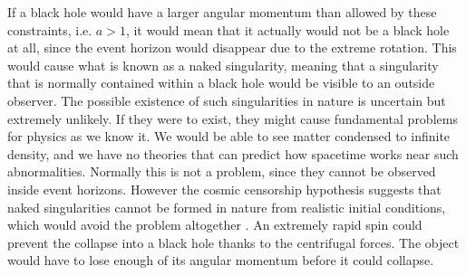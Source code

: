 \documentclass[english, oneside]{HYgradu}
\begin{document}
If a black hole would have a larger angular momentum than allowed by these constraints, i.e. $a > 1$, it would mean that it actually would not be a black hole at all, since the event horizon would disappear due to the extreme rotation. 
This would cause what is known as a naked singularity, meaning that a singularity that is normally contained within a black hole would be visible to an outside observer. The possible existence of such singularities in nature is uncertain but extremely unlikely. If they were to exist, they might cause fundamental problems for physics as we know it. We would be able to see matter condensed to infinite density, and we have no theories that can predict how spacetime works near such abnormalities. Normally this is not a problem, since they cannot be observed inside event horizons. However the cosmic censorship hypothesis suggests that naked singularities cannot be formed in nature from realistic initial conditions, which would avoid the problem altogether \citep{wald:1997}. An extremely rapid spin could prevent the collapse into a black hole thanks to the centrifugal forces. The object would have to lose enough of its angular momentum before it could collapse.
\end{document}
